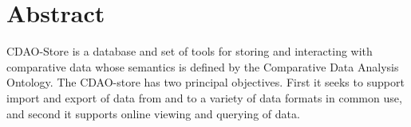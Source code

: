 \section{Abstract}
CDAO-Store is a database and set of tools for storing and interacting with comparative data
whose semantics is defined by the Comparative Data Analysis Ontology. The CDAO-store has two
principal objectives. First it seeks to support import and export of data from and to a variety
of data formats in common use, and second it supports online viewing and querying of data.


